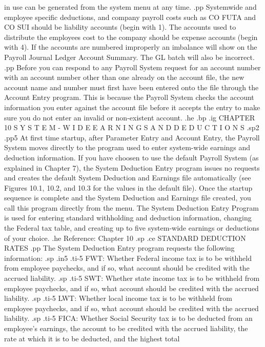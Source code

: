 in use can be generated from the system menu at any time.
.pp
Systemwide and employee specific deductions, and company payroll costs
such as CO FUTA and CO SUI should be liability accounts (begin with 1).
The accounts used to distribute the employees cost to the company should
be expense accounts (begin with 4).  If the accounts are numbered
improperly an imbalance will show on the Payroll Journal Ledger Account
Summary.  The GL batch will also be incorrect.
.pp
Before you can respond to any Payroll System request for an account number
with an account
number other than one already on the account file, the new account name and
number
must first have been entered onto the file through the Account Entry program.
This is because
the Payroll System checks the account information you enter against
the account file before it accepts the entry
to make sure you do not enter an invalid or non-existent
account.
.he
.bp
.ig
CHAPTER 10
S Y S T E M - W I D E
E A R N I N G S    A N D   D E D U C T I O N S
.sp2
.pp5
At first time startup, after Parameter Entry and Account Entry, the
Payroll System moves directly to the program used to enter system-wide
earnings and deduction information.  If you have choosen to use the
default Payroll System (as explained in Chapter 7), the System Deduction
Entry program issues no requests and creates the default System Deduction
and Earnings file automatically (see Figures 10.1, 10.2, and 10.3 for the
values in the default file).
Once the startup sequence is complete and the System Deduction and Earnings
file created,
you call this program directly from the menu.
The System Deduction Entry Program
is used for entering standard withholding and deduction information, changing
the Federal tax table, and creating up to five
system-wide earnings or deductions of your choice.
.he Reference: Chapter 10
.sp
.ce
STANDARD DEDUCTION RATES
.pp
The System Deduction Entry program requests the following
information:
.sp
.in5
.ti-5
FWT: Whether Federal income tax is to be withheld from employee paychecks,
and if so, what account should be credited with the accrued liability.
.sp
.ti-5
SWT: Whether state income tax is to be withheld from employee paychecks,
and if so, what account should be credited with the accrued liability.
.sp
.ti-5
LWT: Whether local income tax is to be withheld from employee paychecks,
and if so, what account
should be credited with the accrued liability.
.sp
.ti-5
FICA: Whether Social Security tax is
to be deducted from an employee's earnings,
the account to be credited with the accrued liability,
the rate at which it is to be deducted, and the highest total
